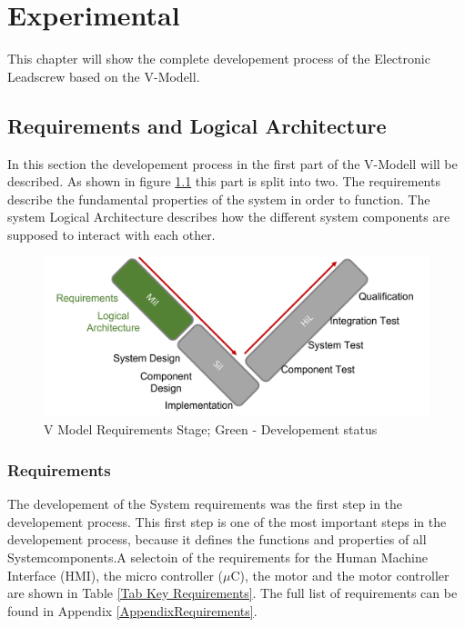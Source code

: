 \chapter{Experimental}
\label{experimental}
This chapter will show the complete developement process of the Electronic Leadscrew based on the V-Modell. 


\section{Requirements and Logical Architecture}

In this section the developement process in the first part of the V-Modell will be described. As shown in figure \ref{V Model Requirements} this part is split into two. The requirements describe the fundamental properties of the system in order to function.
The system Logical Architecture describes how the different system components are supposed to interact with each other.

\begin{figure}[h!]
    \begin{center}
    \includegraphics[width=12cm]{Pictures/V Model Requirements.png}
    \caption[V Model Requirements]{V Model Requirements Stage; Green - Developement status}
    \label{V Model Requirements}
    \end{center}
\end{figure}


\subsection{Requirements}
The developement of the System requirements was the first step in the developement process. This first step is one of the most important steps in the developement process, because it defines the functions and properties of all Systemcomponents.A selectoin of the requirements for the Human Machine Interface (HMI), the micro controller ($\mu$C), the motor and the motor controller are shown in Table \ref{Tab Key Requirements}. The full list of requirements can be found in Appendix \ref{AppendixRequirements}.

